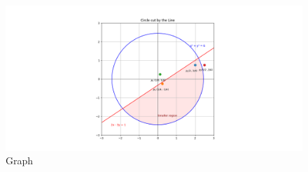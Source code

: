 \documentclass[journal]{IEEEtran}
\begin{document}
\begin{figure}[h]
    \centering
    \includegraphics[width=\columnwidth]{figs/figure_py.png}
    \caption{Graph}
    \label{fig:fig}
 \end{figure}
\end{document}
